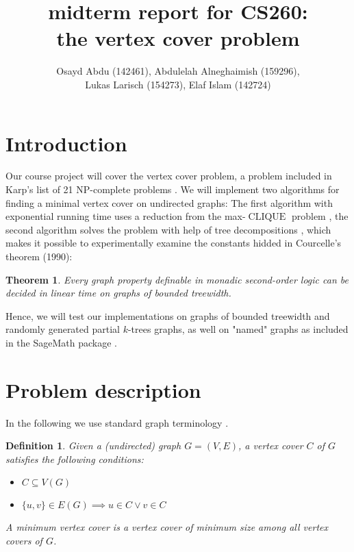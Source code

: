 \documentclass[11pt,a4paper]{article}
\title{midterm report for CS260: \\ \normalsize the vertex cover problem}
\author{Osayd Abdu (142461), Abdulelah Alneghaimish (159296), \\ Lukas Larisch (154273), Elaf Islam (142724)}
\date{}
\newtheorem*{definition}{Definition}
\newtheorem*{theorem}{Theorem}
\DeclareMathOperator{\CLIQUE}{CLIQUE}
\begin{document}
\maketitle

\section{Introduction}

Our course project will cover the vertex cover problem, a problem included in Karp's list of 21 NP-complete  problems \cite{karp, wiki}. We will implement two algorithms for finding a minimal vertex cover on undirected graphs: The first algorithm with exponential running time uses a reduction from the max-$\CLIQUE$ problem \cite{Patric}, the second algorithm solves the problem with help of tree decompositions \cite{survey, graphminor, arnborg}, which makes it possible to experimentally examine the constants hidded in Courcelle's theorem (1990):

\begin{theorem}
Every graph property definable in monadic second-order logic can be decided in linear time on graphs of bounded treewidth.
\end{theorem}

Hence, we will test our implementations on graphs of bounded treewidth and randomly generated partial $k$-trees graphs, as well on "named" graphs as included in the SageMath package \cite{sage}.

\section{Problem description}

In the following we use standard graph terminology \cite{Diestel}.

\begin{definition}

Given a (undirected) graph $G = (V, E)$, a \emph{vertex cover} $C$ of $G$ satisfies the following conditions:

\begin{itemize}
\item $C \subseteq V(G)$ 
\item $\{u, v\} \in E(G) \implies u \in C \lor v \in C$ 
\end{itemize}

A \emph{minimum vertex cover} is a vertex cover of minimum size among all vertex covers of $G$.

\end{definition}
\end{document}
